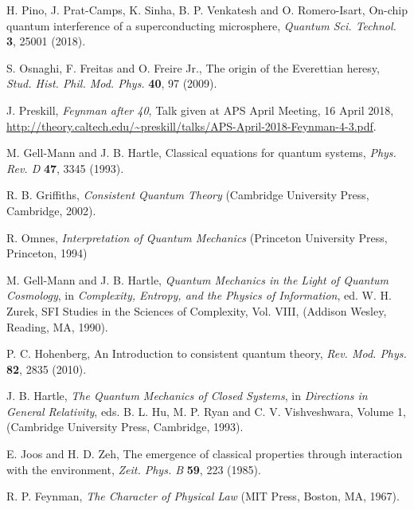 \documentclass{ws-procs961x669}            %
\begin{document}
\begin{thebibliography}{10}
H. Pino, J. Prat-Camps, K. Sinha, B. P. Venkatesh and O. Romero-Isart, On-chip quantum interference of a
superconducting microsphere, {\em Quantum Sci. Technol.} {\bf 3}, 25001 (2018).

S. Osnaghi, F. Freitas and O. Freire Jr., The origin of the Everettian heresy, {\em Stud. Hist. Phil. Mod. Phys.} {\bf 40}, 97 (2009).

J. Preskill, {\em Feynman after 40}, Talk given at APS April Meeting, 16 April 2018,
\url{http://theory.caltech.edu/~preskill/talks/APS-April-2018-Feynman-4-3.pdf}.

M. Gell-Mann and J. B. Hartle, Classical equations for quantum systems, {\em Phys. Rev. D} {\bf 47}, 3345 (1993).

R. B. Griffiths, {\em Consistent Quantum Theory} (Cambridge University Press, Cambridge, 2002).

R. Omnes, {\em Interpretation of Quantum Mechanics} (Princeton University Press, Princeton, 1994)

M. Gell-Mann and J. B. Hartle, {\em Quantum Mechanics in the
Light of Quantum Cosmology}, in {\em Complexity, Entropy, and the Physics of Information}, ed. W. H. Zurek, SFI
Studies in the Sciences of Complexity, Vol. VIII, (Addison Wesley, Reading, MA, 1990).

P. C. Hohenberg, An Introduction to consistent quantum theory, {\em Rev. Mod. Phys.} {\bf 82}, 2835 (2010).

J. B. Hartle, {\em The Quantum Mechanics of Closed Systems}, in {\em Directions in General Relativity}, eds. B. L. Hu, M. P. Ryan and C. V. Vishveshwara, Volume 1, (Cambridge University Press, Cambridge, 1993).

E. Joos and H. D. Zeh, The emergence of classical properties
through interaction with the environment, {\em Zeit. Phys. B} {\bf 59}, 223 (1985).

R. P. Feynman, {\em The Character of Physical Law} (MIT Press,
Boston, MA, 1967).

\end{thebibliography}
\end{document}
